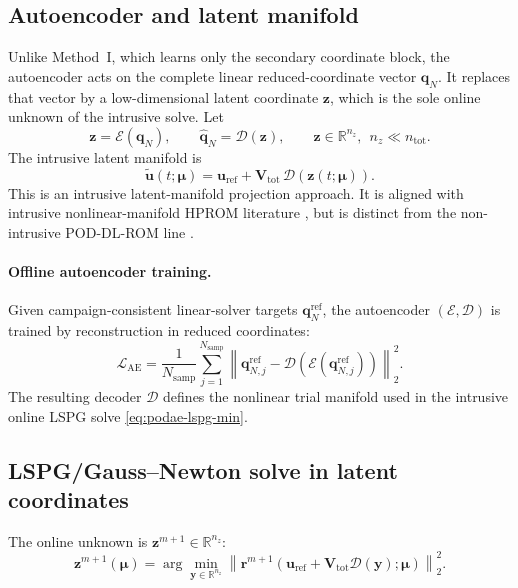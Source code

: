 \documentclass[11pt]{article}
\begin{document}
\subsection{Autoencoder and latent manifold}
Unlike Method~I, which learns only the secondary coordinate block, the
autoencoder acts on the complete linear reduced-coordinate vector
$\mathbf q_N$. It replaces that vector by a low-dimensional latent coordinate
$\mathbf z$, which is the sole online unknown of the intrusive solve.
Let
\begin{equation}
\mathbf z=\mathcal E(\mathbf q_N),
\qquad
\widehat{\mathbf q}_N=\mathcal D(\mathbf z),
\qquad
\mathbf z\in\mathbb R^{n_z},\ \ n_z\ll n_{\mathrm{tot}}.
\end{equation}
The intrusive latent manifold is
\begin{equation}
\tilde{\mathbf u}(t;\bm\mu)
=
\mathbf u_{\mathrm{ref}}+\mathbf V_{\mathrm{tot}}\,\mathcal D(\mathbf z(t;\bm\mu)).
\label{eq:podae-manifold}
\end{equation}
This is an intrusive latent-manifold projection approach.  It is aligned with
intrusive nonlinear-manifold HPROM literature \cite{romor2025explicable}, but
is distinct from the non-intrusive POD-DL-ROM line \cite{fresca2022pod}.

\paragraph{Offline autoencoder training.}
Given campaign-consistent linear-solver targets $\mathbf q_N^{\mathrm{ref}}$, the autoencoder
$(\mathcal E,\mathcal D)$ is trained by reconstruction in reduced coordinates:
\begin{equation}
\mathcal L_{\mathrm{AE}}
=
\frac{1}{N_{\mathrm{samp}}}
\sum_{j=1}^{N_{\mathrm{samp}}}
\left\|
\mathbf q_{N,j}^{\mathrm{ref}}
-
\mathcal D\!\left(\mathcal E(\mathbf q_{N,j}^{\mathrm{ref}})\right)
\right\|_2^2.
\end{equation}
The resulting decoder $\mathcal D$ defines the nonlinear trial manifold used in
the intrusive online LSPG solve \eqref{eq:podae-lspg-min}.

\subsection{LSPG/Gauss--Newton solve in latent coordinates}
The online unknown is $\mathbf z^{m+1}\in\mathbb R^{n_z}$:
\begin{equation}
\mathbf z^{m+1}(\bm\mu)
=
\arg\min_{\mathbf y\in\mathbb R^{n_z}}
\left\|
\mathbf r^{m+1}(\mathbf u_{\mathrm{ref}}+\mathbf V_{\mathrm{tot}}\mathcal D(\mathbf y);\bm\mu)
\right\|_2^2.
\label{eq:podae-lspg-min}
\end{equation}
\end{document}
